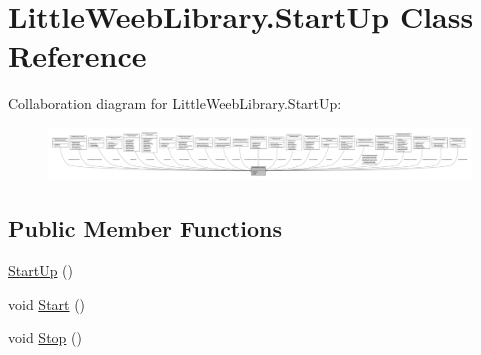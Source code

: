 \hypertarget{class_little_weeb_library_1_1_start_up}{}\section{Little\+Weeb\+Library.\+Start\+Up Class Reference}
\label{class_little_weeb_library_1_1_start_up}


Collaboration diagram for Little\+Weeb\+Library.\+Start\+Up\+:\nopagebreak
\begin{figure}[H]
\begin{center}
\leavevmode
\includegraphics[width=350pt]{class_little_weeb_library_1_1_start_up__coll__graph}
\end{center}
\end{figure}
\subsection*{Public Member Functions}
\begin{DoxyCompactItemize}
\item 
\mbox{\hyperlink{class_little_weeb_library_1_1_start_up_a7f35b9dfb45fb003a9653d1f531044c9}{Start\+Up}} ()
\item 
void \mbox{\hyperlink{class_little_weeb_library_1_1_start_up_a2ea98092dfdb92bfc6decfdc373d6e78}{Start}} ()
\item 
void \mbox{\hyperlink{class_little_weeb_library_1_1_start_up_aaa6147f0dd162c1962e575689dcb22c5}{Stop}} ()
\end{DoxyCompactItemize}
